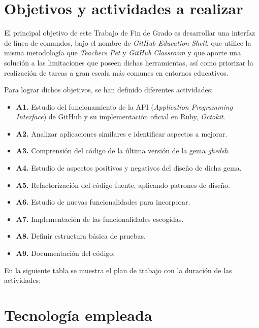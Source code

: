 \section{Objetivos y actividades a realizar}
\label{1:sec:3}

El principal objetivo de este Trabajo de Fin de Grado es desarrollar una interfaz de línea de comandos, bajo el nombre de {\it GitHub Education Shell},
que utilice la misma metodología que {\it Teachers Pet} y {\it GitHub Classroom} y que aporte una solución a las limitaciones que poseen dichas herramientas, así como priorizar
la realización de tareas a gran escala más comunes en entornos educativos.
\bigskip

Para lograr dichos objetivos, se han definido diferentes actividades:
\begin{itemize}
  \item {\bf A1.} Estudio del funcionamiento de la API ({\it Application Programming Interface}) de GitHub y su implementación oficial en Ruby, {\it Octokit}.
  \item {\bf A2.} Analizar aplicaciones similares e identificar aspectos a mejorar.
  \item {\bf A3.} Comprensión del código de la última versión de la gema {\it ghedsh}.
  \item {\bf A4.} Estudio de aspectos positivos y negativos del diseño de dicha gema.
  \item {\bf A5.} Refactorización del código fuente, aplicando patrones de diseño.
  \item {\bf A6.} Estudio de nuevas funcionalidades para incorporar.
  \item {\bf A7.} Implementación de las funcionalidades escogidas.
  \item {\bf A8.} Definir estructura básica de pruebas.
  \item {\bf A9.} Documentación del código.
\end{itemize}
\bigskip

En la siguiente tabla se muestra el plan de trabajo con la duración de las actividades:


\section{Tecnología empleada}
\label{1:sec:4}
 
